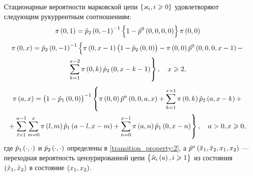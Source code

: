 \documentclass[a4paper,14pt,russian]{article}
\newcommand{\Markk}[0]{\brrr{ \vk_i, i \geqslant 0}}
\newcommand{\Markkhata}[0]{\brrr{ \hat{\vk}_i\br{a}, i \geqslant 1}}
\newcommand{\p}{\hat{p}}
\begin{document}
\begin{lemma}
 Стационарные вероятности марковской цепи $\Markk$ удовлетворяют следующим рукуррентным соотношениям:
 \begin{equation}
\pi\br{0,1} = \p_2\br{0,-1}^{-1} \brrr{1 - \p^0\br{0,0,0,0}} \pi\br{0,0} 
\label{rek:1} 
\end{equation}
\begin{multline}
 \pi\br{0,x} = \p_2\br{0,-1}^{-1}  \left\{ \pi\br{0,x-1} \br{1 - \p_2\br{0,0}} - \pi\br{0,0}\p^0\br{0,0,0,x-1} - \right. \\
 \left. \sum_{k=1}^{x-2}\pi\br{0,k}\p_2\br{0,x-k-1}\right\}, \quad x \geqslant 2,
\label{rek:2} 
\end{multline}
\begin{multline}
 \pi\br{a,x} = \br{1-\p_1\br{0,0}}^{-1} \left\{\pi\br{0,0}\p^a\br{0,0,a,x} + \sum_{k=1}^{x+1}\pi\br{0,k}\p_2\br{a,x-k} +\right.\\ 
  + \left. \sum_{l=1}^{a-1}\sum_{m=0}^{x}\pi\br{l,m}\p_1\br{a-l,x-m} +  \sum_{n=0}^{x-1}\pi\br{a,n}\p_1\br{0,x-n}\right\}, \quad a >0,
  x \geqslant 0,
\label{rek:3}
 \end{multline}
 где $\p_1\br{\cdot,\cdot}$ и $\p_2\br{\cdot,\cdot}$ определены в \eqref{transition_property:2}, а $\p^a\br{\tilde{x}_1,\tilde{x}_2,x_1,x_2}$ 
 --- переходная вероятность цензурированной цепи $\Markkhata$ из состояния $\left(\tilde{x}_1,\tilde{x}_2\right)$ в состояние $\left(x_1,x_2\right)$.
\end{lemma}
\end{document}
